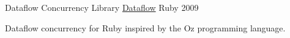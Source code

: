 \begin{cventries}
  \cventry
    {Dataflow Concurrency Library} %
    {\href{https://github.com/larrytheliquid/dataflow}{Dataflow}} %
    {Ruby} %
    {2009} %
    {
      \begin{cvitems} %
        \item {Dataflow concurrency for Ruby inspired by the Oz
          programming language.}
      \end{cvitems}
    }
\end{cventries}
